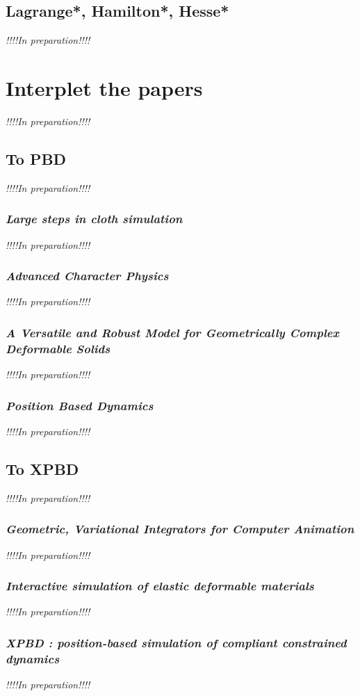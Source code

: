 \documentclass[pdflatex,sn-mathphys-num]{sn-jnl}%
\theoremstyle{thmstyleone}%
\theoremstyle{thmstyletwo}%
\theoremstyle{thmstylethree}%
\newcommand{\inprep}{
	\begin{center}
		\sl\rm {!!!!In preparation!!!!}
\end{center}}
\begin{document}
\subsection{Lagrange*, Hamilton*, Hesse*}
\inprep

\section{Interplet the papers}
\inprep
\subsection{To PBD}
\inprep
\subsubsection{{\sl Large steps in cloth simulation}\cite{LargeStepBaraff}}
\inprep
\subsubsection{{\sl Advanced Character Physics}\cite{Jakobsen2003AdvancedCP}}
\inprep
\subsubsection{\small{\sl A Versatile and Robust Model for Geometrically Complex Deformable Solids}\cite{VersatileTeschner}}
\inprep
\subsubsection{{\sl Position Based Dynamics}\cite{PBD}}
\inprep

\subsection{To XPBD}
\inprep
\subsubsection{{\sl Geometric, Variational Integrators for Computer Animation}\cite{VariationalIntegrators2006}}
\inprep
\subsubsection{{\sl Interactive simulation of elastic deformable materials}\cite{Servin2006InteractiveSO}}
\inprep
\subsubsection{\small{\sl XPBD : position-based simulation of compliant constrained dynamics}\cite{XPBD}}
\inprep
\end{document}
